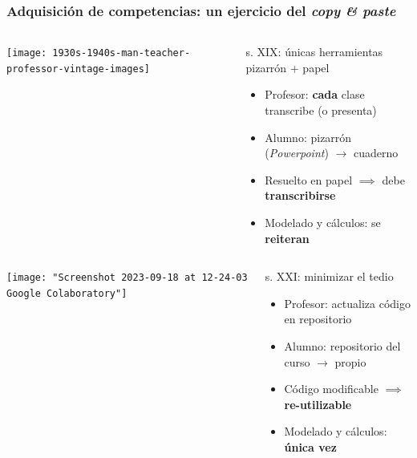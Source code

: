 \documentclass[aspectratio=43]{beamer}
\begin{document}
\begin{frame}
	\frametitle{Adquisición de competencias: un ejercicio del \emph{copy \& paste}}
	\begin{block}{}
	  \begin{columns}[b]
			\begin{column}{0.3\textwidth}
				\texttt{[image: 1930s-1940s-man-teacher-professor-vintage-images]}
			\end{column}
			\begin{column}{0.65\textwidth}
				s. XIX: únicas herramientas pizarrón + papel
				\pause
				\begin{itemize}[<+->]
					\item Profesor: \textbf{cada} clase transcribe (o presenta)
					\item Alumno: pizarrón (\emph{Powerpoint}) \(\rightarrow\) cuaderno
					\item Resuelto en papel \(\implies\) debe \textbf{transcribirse}
					\item Modelado y cálculos: se \textbf{reiteran}
				\end{itemize}
			\end{column}
		\end{columns}
	\end{block}

	\pause
	\begin{block}{}
	  \begin{columns}[b]
			\begin{column}{0.3\textwidth}
				\texttt{[image: "Screenshot 2023-09-18 at 12-24-03 Google Colaboratory"]}
			\end{column}
			\begin{column}{0.65\textwidth}
				s. XXI: minimizar el tedio
				\begin{itemize}[<+->]
					\item Profesor: actualiza código en repositorio
					\item Alumno: repositorio del curso \(\rightarrow\) propio
					\item Código modificable \(\implies\) \textbf{re-utilizable} 
					\item Modelado y cálculos: \textbf{única vez}
				\end{itemize}
			\end{column}
		\end{columns}
	\end{block}
\end{frame}
\end{document}
